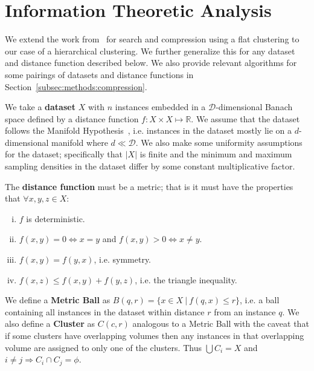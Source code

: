 \section{Information Theoretic Analysis}
\label{sec:information-theoretic-analysis}

We extend the work from~\cite{berger2020levenshtein} for search and compression using a flat clustering to our case of a hierarchical clustering.
We further generalize this for any dataset and distance function described below.
We also provide relevant algorithms for some pairings of datasets and distance functions in Section~\ref{subsec:methods:compression}.

We take a \textbf{dataset} $X$ with $n$ instances embedded in a $\mathcal{D}$-dimensional Banach space defined by a distance function $f: X \times X \mapsto \mathbb{R}$.
We assume that the dataset follows the Manifold Hypothesis~\cite{fefferman2016testing}, i.e. instances in the dataset mostly lie on a $d$-dimensional manifold where $d \ll \mathcal{D}$.
We also make some uniformity assumptions for the dataset;
specifically that $|X|$ is finite and the minimum and maximum sampling densities in the dataset differ by some constant multiplicative factor.

The \textbf{distance function} must be a metric; that is it must have the properties that $\forall x, y, z \in X$:
\begin{enumerate}[i.]
    \item $f$ is deterministic.
    \item $f(x, y) = 0 \Leftrightarrow x = y$ and $f(x, y) > 0 \Leftrightarrow x \neq y$.
    \item $f(x, y) = f(y, x)$, i.e. symmetry.
    \item $f(x, z) \leq f(x, y) + f(y, z)$, i.e. the triangle inequality.
\end{enumerate}


We define a \textbf{Metric Ball} as $B(q, r) = \{ x \in X \ | \ f(q, x) \leq r \}$, i.e. a ball containing all instances in the dataset within distance $r$ from an instance $q$.
We also define a \textbf{Cluster} as $C(c, r)$ analogous to a Metric Ball with the caveat that if some clusters have overlapping volumes then any instances in that overlapping volume are assigned to only one of the clusters.
Thus $\bigcup C_i = X$ and $i \neq j \Rightarrow C_i \cap C_j = \phi$.

